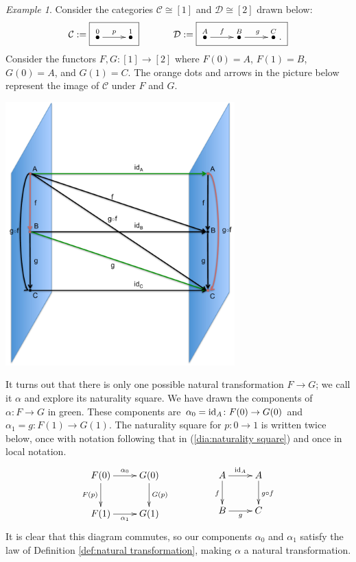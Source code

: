 \documentclass{book}
\def\tn{\textnormal}
\def\mc{\mathcal}
\def\to{\rightarrow}
\def\taking{\colon}
\def\iso{\cong}
\newcommand{\LMO}[1]{\stackrel{#1}{\bullet}}
\def\id{\tn{id}}
\def\mcC{\mc{C}}
\def\mcD{\mc{D}}
\theoremstyle{remark}
\newtheorem{example}[subsubsection]{Example}
\theoremstyle{definition}
\begin{document}
\begin{example}

Consider the categories $\mcC\iso[1]$ and $\mcD\iso[2]$ drawn below:
$$\mcC:=\fbox{\xymatrix{\LMO{0}\ar[r]^p&\LMO{1}
}}
\hspace{.5in}
\mcD:=\fbox{\xymatrix{\LMO{A}\ar[r]^f&\LMO{B}\ar[r]^g&\LMO{C}.
}}
$$
Consider the functors $F,G\taking[1]\to[2]$ where $F(0)=A$, $F(1)=B$, $G(0)=A$, and $G(1)=C$. The orange dots and arrows in the picture below represent the image of $\mcC$ under $F$ and $G$.

\begin{center}
\includegraphics[height=4in]{natTrans}
\end{center}

It turns out that there is only one possible natural transformation $F\to G$; we call it $\alpha$ and explore its naturality square. We have drawn the components of $\alpha\taking F\to G$ in green. These components are $\alpha_0=\id_A\taking F(0)\to G(0)$ and $\alpha_1=g\taking F(1)\to G(1)$. The naturality square for $p\taking 0\to 1$ is written twice below, once with notation following that in (\ref{dia:naturality square}) and once in local notation.
$$
\xymatrix{
F(0)\ar[r]^{\alpha_0}\ar[d]_{F(p)}&G(0)\ar[d]^{G(p)}\\
F(1)\ar[r]_{\alpha_1}&G(1)}
\hspace{.6in}
\xymatrix{
A\ar[r]^{\id_A}\ar[d]_{f}&A\ar[d]^{g\circ f}\\
B\ar[r]_{g}&C
}
$$
It is clear that this diagram commutes, so our components $\alpha_0$ and $\alpha_1$ satisfy the law of Definition \ref{def:natural transformation}, making $\alpha$ a natural transformation.

\end{example}
\end{document}
